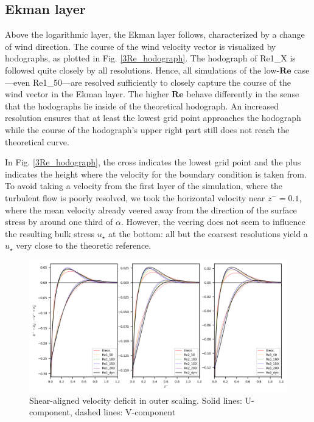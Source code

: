 \documentclass[a4paper,11pt]{article}
\newcommand{\todo}[1]{\textcolor{red}{$[$#1$]$}}
\newcommand{\RE}{\mathbf{Re}}
\providecommand{\DIFadd}[1]{{\protect\color{blue}\uwave{#1}}} %
\providecommand{\DIFaddbegin}{} %
\providecommand{\DIFaddend}{} %
\providecommand{\DIFaddbeginFL}{} %
\providecommand{\DIFaddendFL}{} %
\providecommand{\DIFdelbeginFL}{} %
\providecommand{\DIFdelendFL}{} %
\begin{document}
\subsection{Ekman layer}

Above the logarithmic layer, the Ekman layer follows, characterized by a change of wind direction. The course of the wind velocity vector is visualized by hodographs, as plotted in Fig. \ref{3Re_hodograph}. The hodograph of Re1\_X is followed quite closely by all resolutions. Hence, all simulations of the low-$\RE$ case---even Re1\_50---are resolved sufficiently to closely capture the course of the wind vector in the Ekman layer. The higher $\RE$ behave differently in the sense that the hodographs lie inside of the theoretical hodograph. An increased resolution ensures that at least the lowest grid point approaches the hodograph while the course of the hodograph's upper right part still does not reach the theoretical curve. 

\DIFaddbegin \DIFadd{\todo{translational statement to hodograph missing} }\DIFaddend In Fig. \ref{3Re_hodograph}, the cross indicates the lowest grid point and the plus indicates the height where the velocity for the boundary condition is taken from. To avoid taking a velocity from the first layer of the simulation, where the turbulent flow is poorly resolved, we took the horizontal velocity near $z^-=0.1$, where the mean velocity already veered away from the direction of the surface stress by around one third of $\alpha$. However, the veering does not seem to influence the resulting bulk stress $u_\star$ at the bottom: all but the coarsest resolutions yield a $u_\star$ very close to the theoretic reference.

\begin{figure}[ht]
  \centerline{
	\includegraphics[width=\textwidth]{figures_2024/d3y_3Re_Ekman_lin.png}
}
  \caption{Shear-aligned velocity deficit in outer scaling. Solid lines: U-component, dashed lines: V-component}
  \DIFdelbeginFL %
\DIFdelendFL \DIFaddbeginFL \label{fig:3Re_Ekman}
\DIFaddendFL \end{figure}
\end{document}
